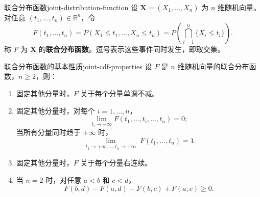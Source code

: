 \begin{mydefinition}{联合分布函数}{joint-distribution-function}
设 $\boldsymbol X=(X_1,\ldots,X_n)$ 为 $n$ 维随机向量。对任意 $(t_1,\ldots,t_n)\in\mathbb R^n$，令
\[
F(t_1,\ldots,t_n)
=P(X_1\leq t_1,\ldots,X_n\leq t_n)
=P\left(\bigcap_{i=1}^n\{X_i\leq t_i\}\right).
\]
称 $F$ 为 $\boldsymbol X$ 的\textbf{联合分布函数}。逗号表示这些事件同时发生，即取交集。
\end{mydefinition}

\begin{proposition}{联合分布函数的基本性质}{joint-cdf-properties}
设 $F$ 是 $n$ 维随机向量的联合分布函数，$n\geq2$，则：
\begin{enumerate}
\item 固定其他分量时，$F$ 关于每个分量单调不减。
\item 固定其他分量时，对每个 $i=1,\ldots,n$，
\[
\lim_{t_i\to-\infty}F(t_1,\ldots,t_i,\ldots,t_n)=0;
\]
当所有分量同时趋于 $+\infty$ 时，
\[
\lim_{\substack{t_1\to+\infty,\ldots,t_n\to+\infty}}
F(t_1,\ldots,t_n)=1.
\]
\item 固定其他分量时，$F$ 关于每个分量右连续。
\item 当 $n=2$ 时，对任意 $a<b$ 和 $c<d$，
\[
F(b,d)-F(a,d)-F(b,c)+F(a,c)\geq0.
\]
\end{enumerate}
\end{proposition}

